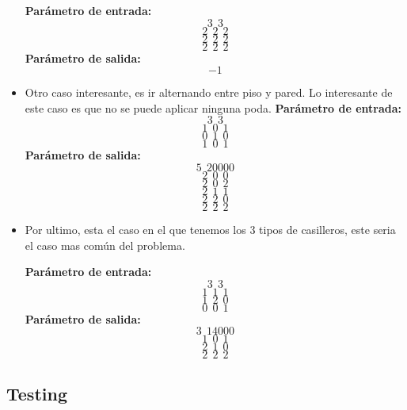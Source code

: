 \begin{itemize}
\textbf{Parámetro de entrada:} 
$$3\ \ 3$$
$$2\ \ 2\ \ 2$$
$$2\ \ 2\ \ 2$$
$$2\ \ 2\ \ 2$$
\textbf{Parámetro de salida:} $$-1$$\newline

\item Otro caso interesante, es ir alternando entre piso y pared. Lo interesante de este caso es que no se puede aplicar ninguna poda.\newline
\textbf{Parámetro de entrada:} 
$$3\ \ 3$$
$$1\ \ 0\ \ 1$$
$$0\ \ 1\ \ 0$$
$$1\ \ 0\ \ 1$$
\textbf{Parámetro de salida:} 
$$5\ \ 20000$$
$$2\ \ 0\ \ 0$$
$$2\ \ 0\ \ 2$$
$$2\ \ 1\ \ 1$$
$$2\ \ 2\ \ 0$$
$$2\ \ 2\ \ 2$$
\newline


\item Por ultimo, esta el caso en el que tenemos los 3 tipos de casilleros, este seria el caso mas común del problema. \newline

\textbf{Parámetro de entrada:} 
$$3\ \ 3$$
$$1\ \ 1\ \ 1$$
$$1\ \ 2\ \ 0$$
$$0\ \ 0\ \ 1$$
\textbf{Parámetro de salida:} 
$$3\ \ 14000$$
$$1\ \ 0\ \ 1$$
$$2\ \ 1\ \ 0$$
$$2\ \ 2\ \ 2$$
\newline
\end{itemize}

\subsection{Testing}


